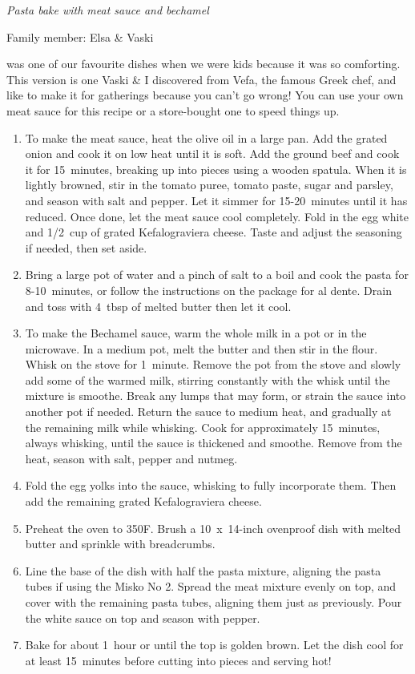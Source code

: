 \textit{Pasta bake with meat sauce and bechamel}

Family member: Elsa \& Vaski

 was one of our favourite dishes when we were kids because it was so comforting. This version is one Vaski \& I discovered from Vefa, the famous Greek chef, and like to make it for gatherings because you can't go wrong! You can use your own meat sauce for this recipe or a store-bought one to speed things up.

\begin{enumerate}
    \item To make the meat sauce, heat the olive oil in a large pan. Add the grated onion and cook it on low heat until it is soft. Add the ground beef and cook it for 15~minutes, breaking up into pieces using a wooden spatula. When it is lightly browned, stir in the tomato puree, tomato paste, sugar and parsley, and season with salt and pepper. Let it simmer for 15-20~minutes until it has reduced. Once done, let the meat sauce cool completely. Fold in the egg white and 1/2~cup of grated Kefalograviera cheese. Taste and adjust the seasoning if needed, then set aside.
    \item Bring a large pot of water and a pinch of salt to a boil and cook the pasta for 8-10~minutes, or follow the instructions on the package for al dente. Drain and toss with 4~tbsp of melted butter then let it cool.
    \item To make the Bechamel sauce, warm the whole milk in a pot or in the microwave. In a medium pot, melt the butter and then stir in the flour. Whisk on the stove for 1~minute. Remove the pot from the stove and slowly add some of the warmed milk, stirring constantly with the whisk until the mixture is smoothe. Break any lumps that may form, or strain the sauce into another pot if needed. Return the sauce to medium heat, and gradually at the remaining milk while whisking. Cook for approximately 15~minutes, always whisking, until the sauce is thickened and smoothe. Remove from the heat, season with salt, pepper and nutmeg.
    \item Fold the egg yolks into the sauce, whisking to fully incorporate them. Then add the remaining grated Kefalograviera cheese.
    \item Preheat the oven to 350\degree F. Brush a 10~x~14-inch ovenproof dish with melted butter and sprinkle with breadcrumbs.
    \item Line the base of the dish with half the pasta mixture, aligning the pasta tubes if using the Misko No 2. Spread the meat mixture evenly on top, and cover with the remaining pasta tubes, aligning them just as previously. Pour the white sauce on top and season with pepper.
    \item Bake for about 1~hour or until the top is golden brown. Let the dish cool for at least 15~minutes before cutting into pieces and serving hot!
\end{enumerate}
